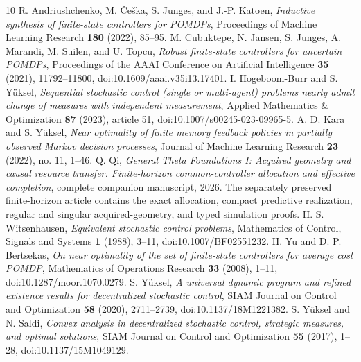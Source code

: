 \begin{thebibliography}{10}
 R. Andriushchenko, M. \v{C}e\v{s}ka, S. Junges, and J.-P. Katoen, \emph{Inductive synthesis of finite-state controllers for POMDPs}, Proceedings of Machine Learning Research \textbf{180} (2022), 85--95.
 M. Cubuktepe, N. Jansen, S. Junges, A. Marandi, M. Suilen, and U. Topcu, \emph{Robust finite-state controllers for uncertain POMDPs}, Proceedings of the AAAI Conference on Artificial Intelligence \textbf{35} (2021), 11792--11800, doi:10.1609/aaai.v35i13.17401.
 I. Hogeboom-Burr and S. Y\"uksel, \emph{Sequential stochastic control (single or multi-agent) problems nearly admit change of measures with independent measurement}, Applied Mathematics \& Optimization \textbf{87} (2023), article 51, doi:10.1007/s00245-023-09965-5.
 A. D. Kara and S. Y\"uksel, \emph{Near optimality of finite memory feedback policies in partially observed Markov decision processes}, Journal of Machine Learning Research \textbf{23} (2022), no. 11, 1--46.
 Q. Qi, \emph{General Theta Foundations I: Acquired geometry and causal resource transfer. Finite-horizon common-controller allocation and effective completion}, complete companion manuscript, 2026. The separately preserved finite-horizon article contains the exact allocation, compact predictive realization, regular and singular acquired-geometry, and typed simulation proofs.
 H. S. Witsenhausen, \emph{Equivalent stochastic control problems}, Mathematics of Control, Signals and Systems \textbf{1} (1988), 3--11, doi:10.1007/BF02551232.
 H. Yu and D. P. Bertsekas, \emph{On near optimality of the set of finite-state controllers for average cost POMDP}, Mathematics of Operations Research \textbf{33} (2008), 1--11, doi:10.1287/moor.1070.0279.
 S. Y\"uksel, \emph{A universal dynamic program and refined existence results for decentralized stochastic control}, SIAM Journal on Control and Optimization \textbf{58} (2020), 2711--2739, doi:10.1137/18M1221382.
 S. Y\"uksel and N. Saldi, \emph{Convex analysis in decentralized stochastic control, strategic measures, and optimal solutions}, SIAM Journal on Control and Optimization \textbf{55} (2017), 1--28, doi:10.1137/15M1049129.
\end{thebibliography}
